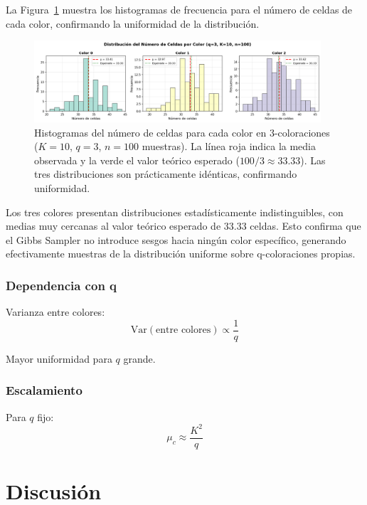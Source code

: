 La Figura~\ref{fig:dist_colores} muestra los histogramas de frecuencia para el número de celdas de cada color, confirmando la uniformidad de la distribución.

\begin{figure}[htbp]
\centering
\includegraphics[width=0.95\textwidth]{img/figuras/distribucion_colores.png}
\caption{Histogramas del número de celdas para cada color en 3-coloraciones ($K=10$, $q=3$, $n=100$ muestras). La línea roja indica la media observada y la verde el valor teórico esperado ($100/3 \approx 33.33$). Las tres distribuciones son prácticamente idénticas, confirmando uniformidad.}
\label{fig:dist_colores}
\end{figure}

Los tres colores presentan distribuciones estadísticamente indistinguibles, con medias muy cercanas al valor teórico esperado de $33.33$ celdas. Esto confirma que el Gibbs Sampler no introduce sesgos hacia ningún color específico, generando efectivamente muestras de la distribución uniforme sobre q-coloraciones propias.

\vspace{1cm}

\subsubsection{Dependencia con q}

Varianza entre colores:
\begin{equation}
\text{Var}(\text{entre colores}) \propto \frac{1}{q}
\end{equation}

Mayor uniformidad para $q$ grande.

\subsubsection{Escalamiento}

Para $q$ fijo:
\begin{equation}
\mu_c \approx \frac{K^2}{q}
\end{equation}

\clearpage
\section{Discusión}

